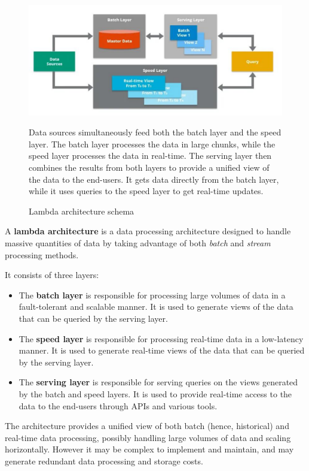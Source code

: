 \begin{figure}[htbp]
   \centering
   \includegraphics{images/17/lambdaarchitecture.png}
   \caption{Lambda architecture schema}
   \label{fig:17/lambdaarchitecture}
   Data sources simultaneously feed both the batch layer and the speed layer. The batch layer processes the data in large chunks, while the speed layer processes the data in real-time.
   The serving layer then combines the results from both layers to provide a unified view of the data to the end-users.
   It gets data directly from the batch layer, while it uses queries to the speed layer to get real-time updates.

\end{figure}

A \textbf{lambda architecture} is a data processing architecture designed to handle massive quantities of data by taking advantage of both \textit{batch} and \textit{stream} processing methods. 
{It consists of three layers:\ns
\begin{itemize}
   \item The \textbf{batch layer} is responsible for processing large volumes of data in a fault-tolerant and scalable manner. It is used to generate views of the data that can be queried by the serving layer.
   \item The \textbf{speed layer} is responsible for processing real-time data in a low-latency manner. It is used to generate real-time views of the data that can be queried by the serving layer.
   \item The \textbf{serving layer} is responsible for serving queries on the views generated by the batch and speed layers. It is used to provide real-time access to the data to the end-users through APIs and various tools.
\end{itemize}
}

The architecture provides a unified view
of both batch (hence, historical) and real-time data
processing, possibly handling large volumes of data and scaling horizontally.
However it may be complex to implement and maintain, and may generate redundant data processing and storage costs.


